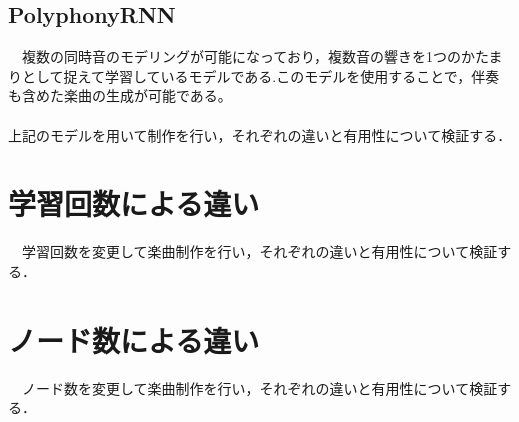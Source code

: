 \subsection{PolyphonyRNN}
　複数の同時音のモデリングが可能になっており，複数音の響きを1つのかたまりとして捉えて学習しているモデルである.このモデルを使用することで，伴奏も含めた楽曲の生成が可能である。\\
\\
上記のモデルを用いて制作を行い，それぞれの違いと有用性について検証する．
\section{学習回数による違い}
　学習回数を変更して楽曲制作を行い，それぞれの違いと有用性について検証する．
\section{ノード数による違い}
　ノード数を変更して楽曲制作を行い，それぞれの違いと有用性について検証する．